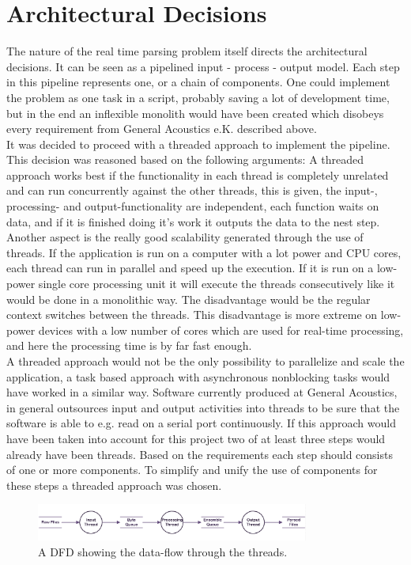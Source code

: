 \section{Architectural Decisions}
The nature of the real time parsing problem itself directs the architectural decisions. It can be seen as a pipelined input - process - output model. Each step in this pipeline represents one, or a chain of components. One could implement the problem as one task in a script, probably saving a lot of development time, but in the end an inflexible monolith would have been created which disobeys every requirement from General Acoustics e.K. described above.\\ It was decided to proceed with a threaded approach to implement the pipeline. This decision was reasoned based on the following arguments: A threaded approach works best if the functionality in each thread is completely unrelated and can run concurrently against the other threads, this is given, the input-, processing- and output-functionality are independent, each function waits on data, and if it is finished doing it's work it outputs the data to the nest step. Another aspect is the really good scalability generated through the use of threads. If the application is run on a computer with a lot power and CPU cores, each thread can run in parallel and speed up the execution. If it is run on a low-power single core processing unit it will execute the threads consecutively like it would be done in a monolithic way. The disadvantage would be the regular context switches between the threads. This disadvantage is more extreme on low-power devices with a low number of cores which are used for real-time processing, and here the processing time is by far fast enough.\\ A threaded approach would not be the only possibility to parallelize and scale the application, a task based approach with asynchronous nonblocking tasks would have worked in a similar way. Software currently produced at General Acoustics, in general outsources input and output activities into threads to be sure that the software is able to e.g. read on a serial port continuously. If this approach would have been taken into account for this project two of at least three steps would already have been threads. Based on the requirements each step should consists of one or more components. To simplify and unify the use of components for these steps a threaded approach was chosen.\\
\begin{figure}[h]
\centering
      \includegraphics[width=0.8\textwidth]{dfd}
        \caption{A DFD showing the data-flow through the threads.}
\end{figure}

